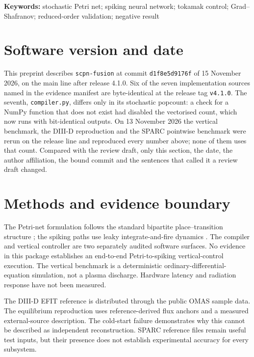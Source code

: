 \documentclass[11pt]{article}
\begin{document}
\noindent\textbf{Keywords:} stochastic Petri net; spiking neural network;
tokamak control; Grad--Shafranov; reduced-order validation; negative result

\section*{Software version and date}

This preprint describes \texttt{scpn-fusion} at commit \texttt{d1f8e5d9176f}
of 15 November 2026, on the main line after release 4.1.0.  Six of the seven
implementation sources named in the evidence manifest are byte-identical at
the release tag \texttt{v4.1.0}.  The seventh, \texttt{compiler.py}, differs
only in its stochastic popcount: a check for a NumPy function that does not
exist had disabled the vectorised count, which now runs with bit-identical
outputs.  On 13 November 2026 the vertical benchmark, the DIII-D reproduction
and the SPARC pointwise benchmark were rerun on the release line and
reproduced every number above; none of them uses that count.  Compared with
the review draft, only this section, the date, the author affiliation, the
bound commit and the sentences that called it a review draft changed.

\section*{Methods and evidence boundary}

The Petri-net formulation follows the standard bipartite place--transition
structure \citep{Petri1962,Murata1989}; the spiking paths use leaky
integrate-and-fire dynamics \citep{Maass1997}.  The compiler and vertical
controller are two separately audited software surfaces.  No evidence in this
package establishes an end-to-end Petri-to-spiking vertical-control execution.
The vertical benchmark is a deterministic ordinary-differential-equation
simulation, not a plasma discharge.  Hardware latency and radiation response
have not been measured.

The DIII-D EFIT reference \citep{Lao1985} is distributed through the public OMAS
sample data.  The equilibrium reproduction uses reference-derived flux anchors
and a measured external-source description.  The cold-start failure demonstrates
why this cannot be described as independent reconstruction.  SPARC reference
files \citep{Creely2020} remain useful test inputs, but their presence does not
establish experimental accuracy for every subsystem.
\end{document}
